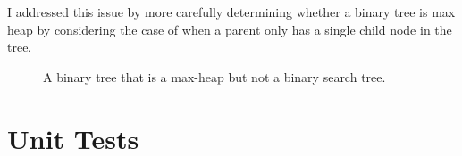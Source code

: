 \documentclass{scrartcl}
\begin{document}
I addressed this issue by more carefully determining whether a binary tree
is max heap by considering the case of when a parent only has a single child
node in the tree.

\begin{figure}[htbp]
\label{fig:max-heap-not-bst}
\centering
{}
\caption{A binary tree that is a max-heap but not a binary search tree.}
\end{figure}

\newpage
\section{Unit Tests}
\label{sec:unittests}

\end{document}
